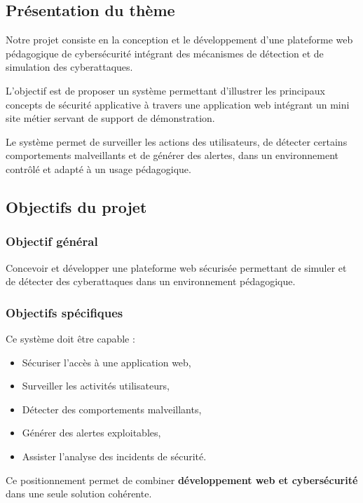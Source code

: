 \documentclass[a4paper,12pt]{report}
\begin{document}
    \subsection{Présentation du thème}
    
    Notre projet consiste en la conception et le développement d’une plateforme web pédagogique de cybersécurité intégrant des mécanismes de détection et de simulation des cyberattaques.
    
    L’objectif est de proposer un système permettant d’illustrer les principaux concepts de sécurité applicative à travers une application web intégrant un mini site métier servant de support de démonstration.
    
    Le système permet de surveiller les actions des utilisateurs, de détecter certains comportements malveillants et de générer des alertes, dans un environnement contrôlé et adapté à un usage pédagogique.
    
    \subsection{Objectifs du projet}
    
    \subsubsection{Objectif général}
    
    Concevoir et développer une plateforme web sécurisée permettant de simuler et de détecter des cyberattaques dans un environnement pédagogique.
    
    \subsubsection{Objectifs spécifiques}  
    
    Ce système doit être capable :
    \begin{itemize}
        \item Sécuriser l'accès à une application web,
        \item Surveiller les activités utilisateurs,
        \item Détecter des comportements malveillants,
        \item Générer des alertes exploitables,
        \item Assister l'analyse des incidents de sécurité.
    \end{itemize}
    
    Ce positionnement permet de combiner \textbf{développement web et cybersécurité} dans une seule solution cohérente.
    
\end{document}
